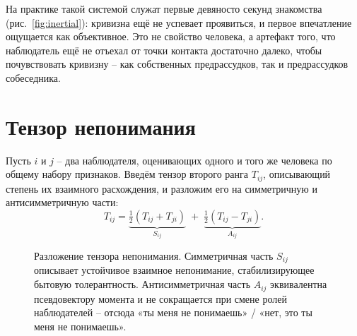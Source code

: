 \documentclass[11pt,a4paper]{article}
\begin{document}
На практике такой системой служат первые девяносто секунд знакомства (рис.~\ref{fig:inertial}): кривизна ещё не успевает проявиться, и первое впечатление ощущается как объективное. Это не свойство человека, а артефакт того, что наблюдатель ещё не отъехал от точки контакта достаточно далеко, чтобы почувствовать кривизну -- как собственных предрассудков, так и предрассудков собеседника.

\section{Тензор непонимания}

Пусть $i$ и $j$ -- два наблюдателя, оценивающих одного и того же человека по общему набору признаков. Введём тензор второго ранга $T_{ij}$, описывающий степень их взаимного расхождения, и разложим его на симметричную и антисимметричную части:
\[
T_{ij} = \underbrace{\tfrac12(T_{ij}+T_{ji})}_{S_{ij}} \;+\; \underbrace{\tfrac12(T_{ij}-T_{ji})}_{A_{ij}}.
\]

\begin{figure}[htbp]
\centering
{}
\caption{Разложение тензора непонимания. Симметричная часть $S_{ij}$ описывает устойчивое взаимное непонимание, стабилизирующее бытовую толерантность. Антисимметричная часть $A_{ij}$ эквивалентна псевдовектору момента и не сокращается при смене ролей наблюдателей -- отсюда «ты меня не понимаешь» / «нет, это ты меня не понимаешь».}
\label{fig:tensor-decomp}
\end{figure}
\end{document}

